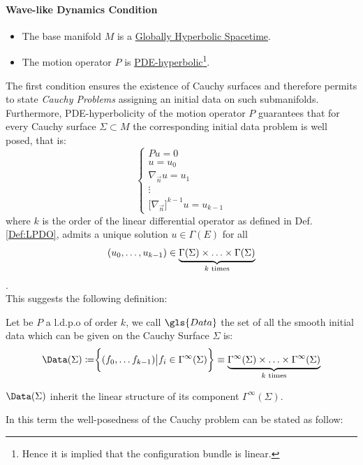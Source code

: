 \documentclass[Main]{subfiles}
\begin{document}
		\paragraph{Wave-like %
			Dynamics Condition}
		\begin{itemize}
			 \item The base manifold $M$ is a \underline{Globally Hyperbolic Spacetime}.
			 \item The motion operator $P$ is \underline{PDE-hyperbolic}\footnote{Hence it is implied that the configuration bundle is linear.}.
		\end{itemize}
		The first condition ensures the existence of Cauchy surfaces and therefore permits to state  \emph{Cauchy Problems} assigning an initial data on such submanifolds.
		Furthermore, PDE-hyperbolicity of the motion operator $P$ guarantees that for every Cauchy surface $\Sigma \subset M$ the corresponding initial data problem is well posed, that is:
			\begin{equation}\label{CauchyProblem}
				\begin{cases} P u = 0 \\ u = u_0 \\ \nabla_{\vec{n}}u= u_1 \\  \vdots \\ \big[\nabla_{\vec{n}} \big]^{k-1}u = u_{k-1}\end{cases}
			\end{equation}
			where $k$ is the order of the linear differential operator as defined in Def. \ref{Def:LPDO},
			admits a unique solution $u\in \Gamma(E)$ for all 
			\begin{displaymath}
				(u_0,\ldots, u_{k-1}) \in \underbrace{\Gamma (\Sigma )\times \ldots \times \Gamma (\Sigma )}_{\footnotesize{ k \textrm{ times}}}
			\end{displaymath}.
			\\
			This suggests the following definition:
			\begin{definition}
				Let be  $P$ a l.d.p.o of order $k$, we call $\gls{Data}$ the set of all the smooth initial data which can be given on the Cauchy Surface $\Sigma$ is:
				\begin{displaymath}
					\Data(\Sigma)  \coloneqq \biggr \{ (f_0,\ldots f_{k-1}) \big \vert f_i \in \Gamma^\infty(\Sigma)\biggr\}  \equiv
					\underbrace{\Gamma^\infty (\Sigma )\times \ldots \times \Gamma^\infty (\Sigma )}_{\footnotesize{ k \textrm{ times}}}					
				\end{displaymath}
			\end{definition}
			\begin{observation}
				$\Data(\Sigma)$ inherit the linear structure of its component $ \Gamma^\infty(\Sigma)$.
			\end{observation}	
			In this term the well-posedness of the Cauchy problem can be stated as follow:
\end{document}
